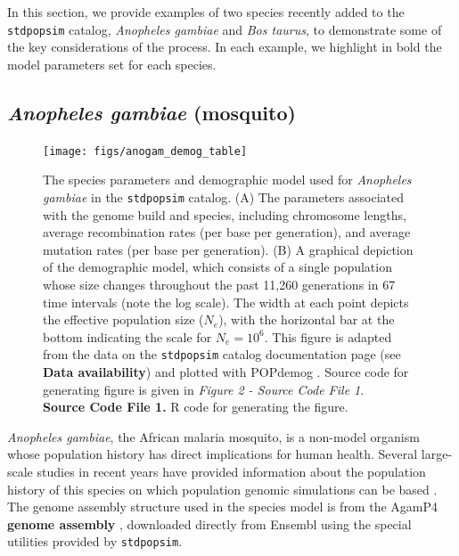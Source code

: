 \documentclass[hidelinks]{article}
\newcommand{\stdpopsim}{\texttt{stdpopsim}\xspace}
\begin{document}
In this section, we provide examples of two species recently added to the \stdpopsim catalog,
\textit{Anopheles gambiae} and \textit{Bos taurus},
to demonstrate some of the key considerations of the process.
In each example, we highlight in bold the model parameters set for each species.

\subsection*{\texorpdfstring{\emph{Anopheles gambiae} (mosquito)}{Anopheles gambiae (mosquito)}}
    \label{AnoGam}
    
\begin{figure}[b!]
	\texttt{[image: figs/anogam\_demog\_table]}
	\caption{The species parameters and demographic model used for \emph{Anopheles gambiae} in the \stdpopsim catalog.
	(A) The parameters associated with the genome build and species, including
	chromosome lengths, average recombination rates (per base per generation),
	and average mutation rates (per base per generation).
	(B) A graphical depiction of the demographic model,
	which consists of a single population whose size changes throughout the past 11,260 generations in 67 time intervals (note the log scale). The width at each point depicts the effective population size ($N_e$), with the horizontal bar at the bottom indicating the scale for $N_e=10^6$.
	This figure is adapted from the data on the \stdpopsim catalog documentation page (see {\bf Data availability}) and plotted with POPdemog \citep{Zhou2018}.
	Source code for generating figure is given in {\em Figure 2 - Source Code File 1}.\\
	{\bf Source Code File 1.} R code for generating the figure.\\
		\label{fig:anogam} }
\end{figure}


\emph{Anopheles gambiae}, the African malaria mosquito, is 
a non-model organism whose population history has direct implications for human health.
Several large-scale studies in recent years have provided information about the
population history of this species on which population genomic simulations can be based \citep[e.g.,][]{Miles2017, clarkson2020genome}.
The genome assembly structure used in the species model is from
the AgamP4 \textbf{genome assembly} \citep{Sharakhova2007},
downloaded directly from Ensembl \citep{ensembl2021}
using the special utilities provided by \stdpopsim.
\end{document}
